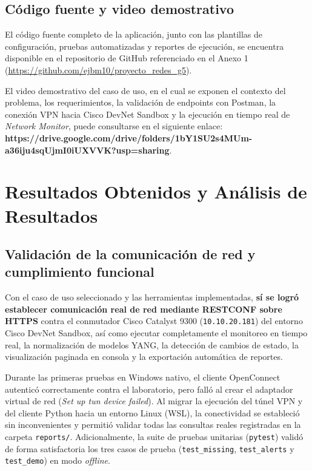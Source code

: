 \documentclass[12pt,a4paper]{article}
\begin{document}
\subsection{Código fuente y video demostrativo}

El código fuente completo de la aplicación, junto con las plantillas de configuración, pruebas automatizadas y reportes de ejecución, se encuentra disponible en el repositorio de GitHub referenciado en el Anexo 1 (\url{https://github.com/ejbm10/proyecto_redes_g5}).

El video demostrativo del caso de uso, en el cual se exponen el contexto del problema, los requerimientos, la validación de endpoints con Postman, la conexión VPN hacia Cisco DevNet Sandbox y la ejecución en tiempo real de \textit{Network Monitor}, puede consultarse en el siguiente enlace: \textbf{https://drive.google.com/drive/folders/1bY1SU2s4MUm-a36iju4sqUjmI0iUXVVK?usp=sharing}.


\newpage
\section{Resultados Obtenidos y Análisis de Resultados}

\subsection{Validación de la comunicación de red y cumplimiento funcional}

Con el caso de uso seleccionado y las herramientas implementadas, \textbf{sí se logró establecer comunicación real de red mediante RESTCONF sobre HTTPS} contra el conmutador Cisco Catalyst 9300 (\texttt{10.10.20.181}) del entorno Cisco DevNet Sandbox, así como ejecutar completamente el monitoreo en tiempo real, la normalización de modelos YANG, la detección de cambios de estado, la visualización paginada en consola y la exportación automática de reportes.

Durante las primeras pruebas en Windows nativo, el cliente OpenConnect autenticó correctamente contra el laboratorio, pero falló al crear el adaptador virtual de red (\textit{Set up tun device failed}). Al migrar la ejecución del túnel VPN y del cliente Python hacia un entorno Linux (WSL), la conectividad se estableció sin inconvenientes y permitió validar todas las consultas reales registradas en la carpeta \texttt{reports/}. Adicionalmente, la suite de pruebas unitarias (\texttt{pytest}) validó de forma satisfactoria los tres casos de prueba (\texttt{test\_missing}, \texttt{test\_alerts} y \texttt{test\_demo}) en modo \textit{offline}.
\end{document}
